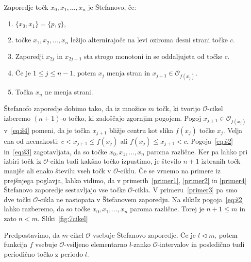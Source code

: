 \documentclass[mat2]{fmfdelo}
\begin{document}
\begin{definicija}
Zaporedje točk $x_0, x_1, \dots, x_n$ je Štefanovo, če:

  \begin{enumerate}[label={(Š\arabic*)}]
    \item $\{x_0, x_1\} = \{p, q\}$, \label{eq:š1}
    \item točke $x_1, x_2, \dots, x_n$ ležijo alternirajoče na levi oziroma desni strani točke $c$. \label{eq:š2}
    \item Zaporedji $x_{2j}$ in $x_{2j+1}$ sta strogo monotoni in se oddaljujeta od točke $c$. \label{eq:š3}
    \item Če je $1\leq j \leq n-1$, potem $x_j$ menja stran in $x_{j+1} \in \mathcal{O}_{f(x_j)}$.\label{eq:š4}
    \item Točka $x_n$ ne menja strani. \label{eq:š5}
  \end{enumerate}
  
\end{definicija}
\begin{opomba}
Štefanofo zaporedje dobimo tako, da iz množice $m$ točk, ki tvorijo $\mathcal{O}$-cikel izberemo $(n+1)$-o točko, ki zadoščajo zgornjim pogojem. 
Pogoj $x_{j+1} \in \mathcal{O}_{f(x_j)}$ v~\ref{eq:š4} pomeni, da je točka $x_{j+1}$ bližje centru kot slika $f(x_j)$ točke $x_j$. Velja ena od neenakosti: $c < x_{j+1} \leq f(x_j)$ ali $f(x_j) \leq x_{j+1} < c$. 
Pogoja~\ref{eq:š2} in~\ref{eq:š3} zagotavljata, da so točke $x_0, x_1, \dots, x_n$ paroma različne. Ker pa lahko pri izbiri točk iz $\mathcal{O}$-cikla tudi kakšno točko izpustimo, je število $n+1$ izbranih točk manjše ali enako številu vseh točk v $\mathcal{O}$-ciklu. Če se vrnemo na primere iz prejšnjega poglavja, lahko vidimo, da v primerih~\ref{primer1}, \ref{primer2} in \ref{primer4} Štefanovo zaporedje sestavljajo vse točke $\mathcal{O}$-cikla. V primeru~\ref{primer3} pa smo dve točki $\mathcal{O}$-cikla ne nastopata v Štefanovem zaporedju.
 Na slikiIz pogoja~\ref{eq:š2} lahko razberemo, da so točke $x_0, x_1, \dots, x_n$ paroma različne. Torej je $n+1 \leq m$ in zato $n<m$. Sliki~\ref{fig:7cikel}
\end{opomba}

\begin{trditev}\label{trd:zap-cikel}
Predpostavimo, da $m$-cikel $\mathcal{O}$ vsebuje Štefanovo zaporedje. Če je $l \triangleleft m$, potem funkcija $f$ vsebuje $\mathcal{O}$-vsiljeno elementarno $l$-zanko $\mathcal{O}$-intervalov in posledično tudi periodično točko z periodo $l$.
\end{trditev}
\end{document}
